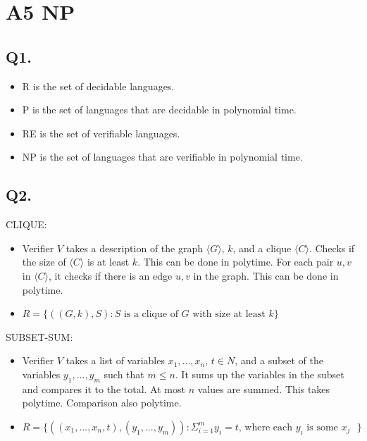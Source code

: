 \documentclass[letterpaper]{article}
\begin{document}
\flushleft
\renewcommand{\labelitemiii}{\(\smallblackcircle\)}
\renewcommand{\labelitemii}{\(\smallblackcircle\)}

\lstset{
  basicstyle=\ttfamily,
  mathescape
}

\section*{A5 NP}

\subsection*{Q1.}

\begin{itemize}
  \item R is the set of decidable languages.

  \item P is the set of languages that are decidable in polynomial time.

  \item RE is the set of verifiable languages.

  \item NP is the set of languages that are verifiable in polynomial time.
\end{itemize}

\subsection*{Q2.}

CLIQUE:
\begin{itemize}
  \item Verifier $V$ takes a description of the graph $\langle G \rangle$, $k$,
        and a clique $\langle C \rangle$.
        Checks if the size of $\langle C \rangle$ is at least $k$.
        This can be done in polytime.
        For each pair $u,v$ in $\langle C \rangle$, it checks if there is
        an edge $u,v$ in the graph. This can be done in polytime.
  \item $R = \{ ((G,k), S) : S \text{ is a clique of $G$ with size at least $k$} \}$
\end{itemize}

SUBSET-SUM:
\begin{itemize}
  \item Verifier $V$ takes a list of variables $x_1,...,x_n$,
        $t \in N$, and a subset of the variables $y_1,...,y_m$ such that
        $m \le n$.
        It sums up the variables in the subset and compares it to the total.
        At most $n$ values are summed. This takes polytime.
        Comparison also polytime.
  \item $R = \{ ((x_1,...,x_n,t), (y_1,..., y_m)) : \Sigma_{i=1}^{m} y_i = t \text{, where each $y_i$ is some $x_j$ } \}$
\end{itemize}
\end{document}
